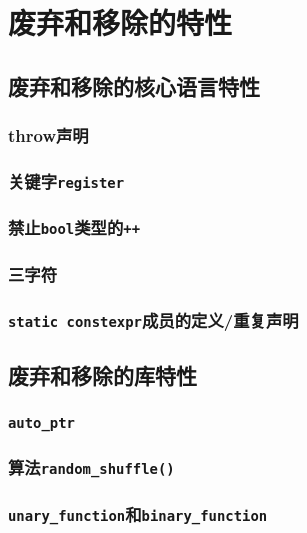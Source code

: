 \chapter{废弃和移除的特性}\label{ch35}


\section{废弃和移除的核心语言特性}

\subsection{throw声明}

\subsection{关键字\texttt{register}}

\subsection{禁止\texttt{bool}类型的\texttt{++}}

\subsection{三字符}

\subsection{\texttt{static constexpr}成员的定义/重复声明}


\section{废弃和移除的库特性}

\subsection{\texttt{auto\_ptr}}

\subsection{算法\texttt{random\_shuffle()}}

\subsection{\texttt{unary\_function}和\texttt{binary\_function}}

